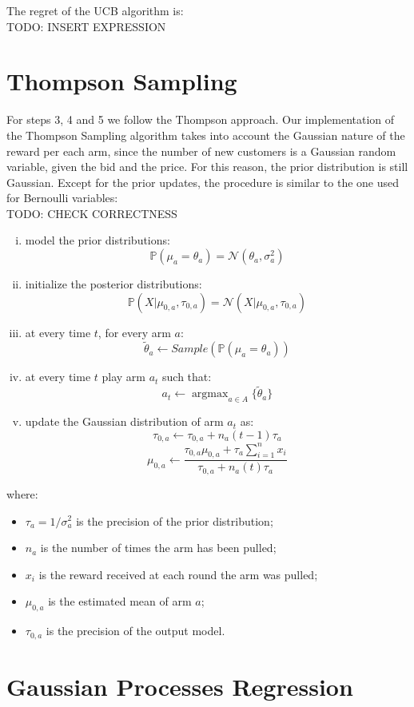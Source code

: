 \documentclass[12pt,a4paper]{report}
\DeclareMathOperator*{\argmax}{argmax}
\begin{document}
The regret of the UCB algorithm is: \\TODO: INSERT EXPRESSION


		\section{Thompson Sampling}
For steps 3, 4 and 5 we follow the Thompson approach.
Our implementation of the Thompson Sampling algorithm takes into account the Gaussian nature of the reward per each arm, since the number of new customers is a Gaussian random variable, given the bid and the price. For this reason, the prior distribution is still Gaussian. 
Except for the prior updates, the procedure is similar to the one used for Bernoulli variables:
\\TODO: CHECK CORRECTNESS
\begin{enumerate}[i)]
	\item model the prior distributions: $$\mathbb{P}(\mu_a = \theta_a) = \mathcal{N}(\theta_a, \sigma^2_a)$$
	\item initialize the posterior distributions: $$\mathbb{P}(X|\mu_{0,a}, \tau_{0,a}) = \mathcal{N}(X|\mu_{0,a}, \tau_{0,a}) $$
	\item at every time $t$, for every arm $a$:
\[ \tilde \theta_a \leftarrow Sample\left(\mathbb{P}(\mu_a = \theta_a)\right)\]
	\item at every time $t$ play arm $a_t$ such that:
		$$a_t \leftarrow \argmax_{a \in A} \{\tilde \theta_a\} $$
	\item update the Gaussian distribution of arm $a_t$ as:
		$$\tau_{0,a} \leftarrow \tau_{0,a} + n_a(t-1)\tau_a $$
		$$\mu_{0,a} \leftarrow \frac{\tau_{0,a}\mu_{0,a} + \tau_a \sum_{i=1}^{n}{x_i}}{\tau_{0,a} + n_a(t)\tau_a} $$
\end{enumerate}
where:
\begin{itemize}
	\item $\tau_a = 1/\sigma^2_a$ is the precision of the prior distribution;
	\item $n_a$ is the number of times the arm has been pulled;
	\item $x_i$ is the reward received at each round the arm was pulled;
	\item $\mu_{0,a}$ is the estimated mean of arm $a$;
	\item $\tau_{0,a}$ is the precision of the output model.
\end{itemize}		

\section{Gaussian Processes Regression}
\end{document}
